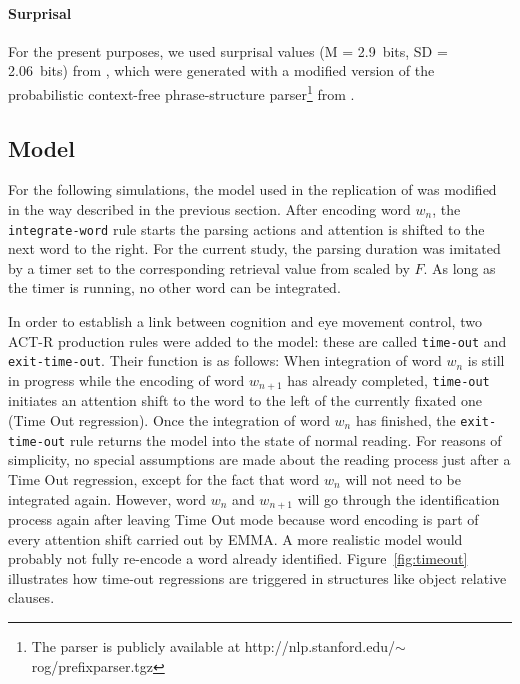 \paragraph{Surprisal}
For the present purposes, we used surprisal values (M = 2.9~bits, SD = 2.06~bits) from \cite{jemrsurprisal}, which were generated with a modified version of the probabilistic context-free phrase-structure parser\footnote{The parser is publicly available at http://nlp.stanford.edu/$\sim$rog/prefixparser.tgz} from \cite{Levy2008}.

\subsection{Model}
For the following simulations, the model used in the replication of \cite{Salvucci2001} was modified in the way described in the previous section.  
After encoding word $w_n$, the \texttt{integrate-word} rule starts the parsing actions and attention is shifted to the next word to the right.  For the current study, the parsing duration was imitated by a timer set to the corresponding retrieval value from \cite{jemrsurprisal} scaled by $F$.  As long as the timer is running, no other word can be integrated.

In order to establish a link between cognition and eye movement control, two ACT-R production rules were added to the model: these are called \texttt{time-out} and  \texttt{exit-time-out}.  Their function is as follows: When integration of word $w_n$ is still in progress while the encoding of word $w_{n+1}$ has already completed, \texttt{time-out} initiates an attention shift to the word to the left of the currently fixated one  (Time Out regression).  Once the integration of word $w_n$ has finished, the \texttt{exit-time-out} rule returns the model into the state of normal reading.
For reasons of simplicity, no special assumptions are made about the reading process just after a Time Out regression, except for the fact that word $w_n$ will not need to be integrated again.  However, word $w_{n}$ and $w_{n+1}$ will go through the identification process again after leaving Time Out mode because word encoding is part of every attention shift carried out by EMMA.  A more realistic model would probably not fully re-encode a word already identified.  Figure~\ref{fig:timeout} illustrates how time-out regressions are triggered in structures like object relative clauses.

